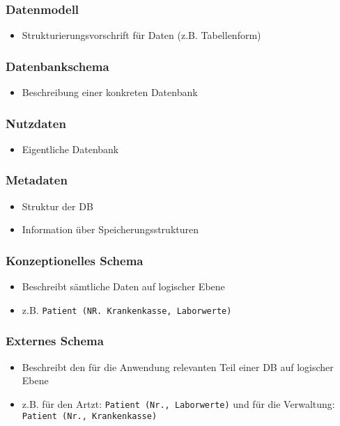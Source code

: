 \subsubsection{Datenmodell}
\begin{itemize}
	\item Strukturierungsvorschrift für Daten (z.B. Tabellenform)
\end{itemize}
\subsubsection{Datenbankschema}
\begin{itemize}
	\item Beschreibung einer konkreten Datenbank
\end{itemize}
\subsubsection{Nutzdaten}
\begin{itemize}
	\item Eigentliche Datenbank 
\end{itemize}
\subsubsection{Metadaten}
\begin{itemize}
	\item Struktur der DB
	\item Information über Speicherungsstrukturen
\end{itemize}
\subsubsection{Konzeptionelles Schema}
\begin{itemize}
	\item Beschreibt sämtliche Daten auf logischer Ebene 
	\item z.B. \verb|Patient (NR. Krankenkasse, Laborwerte)|
\end{itemize}
\subsubsection{Externes Schema}
\begin{itemize}
	\item Beschreibt den für die Anwendung relevanten Teil einer DB auf logischer Ebene
	\item z.B. für den Artzt: \verb|Patient (Nr., Laborwerte)| und für die Verwaltung: \verb|Patient (Nr., Krankenkasse)|
\end{itemize}
